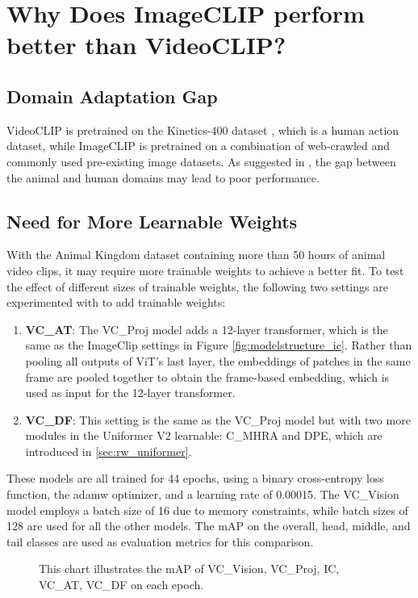 \section{Why Does ImageCLIP perform better than VideoCLIP?}
\label{sec:discussion_vc}
\subsection{Domain Adaptation Gap}
VideoCLIP is pretrained on the Kinetics-400 dataset \parencite{kay2017kinetics}, which is a human action dataset, while ImageCLIP is pretrained on a combination of web-crawled and commonly used pre-existing image datasets. As suggested in \parencite{farahani2021brief}, the gap between the animal and human domains may lead to poor performance.

\subsection{Need for More Learnable Weights}
With the Animal Kingdom dataset containing more than 50 hours of animal video clips, it may require more trainable weights to achieve a better fit. To test the effect of different sizes of trainable weights, the following two settings are experimented with to add trainable weights:

\begin{enumerate}
    \item \textbf{VC\_AT}: The VC\_Proj model adds a 12-layer transformer, which is the same as the ImageClip settings in Figure \ref{fig:modelstructure_ic}. Rather than pooling all outputs of ViT's last layer, the embeddings of patches in the same frame are pooled together to obtain the frame-based embedding, which is used as input for the 12-layer transformer.
    \item \textbf{VC\_DF}: This setting is the same as the VC\_Proj model but with two more modules in the Uniformer V2 learnable: C\_MHRA and DPE, which are introduced in \ref{sec:rw_uniformer}. 
\end{enumerate}

These models are all trained for 44 epochs, using a binary cross-entropy loss function, the adamw optimizer, and a learning rate of 0.00015. The VC\_Vision model employs a batch size of 16 due to memory constraints, while batch sizes of 128 are used for all the other models. The mAP on the overall, head, middle, and tail classes are used as evaluation metrics for this comparison.

\begin{figure}[ht]
    \centering
    \resizebox{0.7\textwidth}{!}{}
    \caption[mAP of VC\_Vision, VC\_Proj, IC, VC\_AT, VC\_DF on each Epoch]{This chart illustrates the mAP of VC\_Vision, VC\_Proj, IC, VC\_AT, VC\_DF on each epoch.}
    \label{fig:ablation_vc}
\end{figure}

